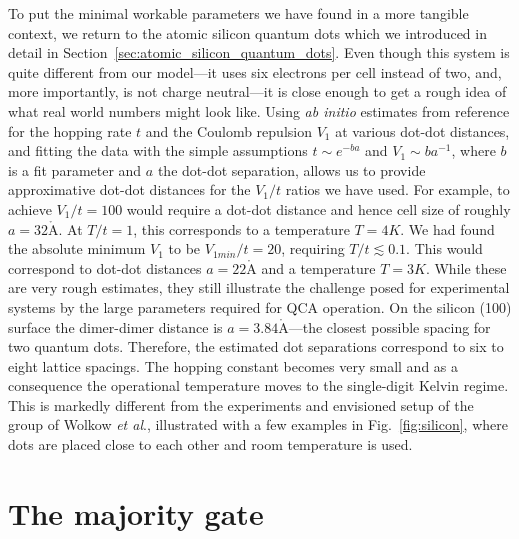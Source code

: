 To put the minimal workable parameters we have found in a more tangible context,
we return to the atomic silicon quantum dots which we introduced in detail in
Section~\ref{sec:atomic_silicon_quantum_dots}. Even though this system is quite
different from our model---it uses six electrons per cell instead of two, and,
more importantly, is not charge neutral---it is close enough to get a rough idea
of what real world numbers might look like. Using \emph{ab initio} estimates
from reference \cite{pitters2011tunnel} for the hopping rate $t$ and the Coulomb
repulsion $V_1$ at various dot-dot distances, and fitting the data with the
simple assumptions $t \sim e^{-b a}$ and $V_1 \sim b a^{-1}$, where $b$ is a fit
parameter and $a$ the dot-dot separation, allows us to provide approximative
dot-dot distances for the $V_1/t$ ratios we have used. For example, to achieve
$V_1/t = 100$ would require a dot-dot distance and hence cell size of roughly $a
= 32 \mathring{\mathrm{A}}$. At $T/t = 1$, this corresponds to a temperature $T
= 4K$. We had found the absolute minimum $V_1$ to be $V_{1min}/t = 20$,
requiring $T/t \lesssim 0.1$. This would correspond to dot-dot distances $a = 22
\mathring{\mathrm{A}}$ and a temperature $T = 3 K$. While these are very rough
estimates, they still illustrate the challenge posed for experimental systems by
the large parameters required for QCA operation. On the silicon (100) surface
the dimer-dimer distance is $a = 3.84 \mathring{\mathrm{A}}$---the closest
possible spacing for two quantum dots. Therefore, the estimated dot separations
correspond to six to eight lattice spacings. The hopping constant becomes very
small and as a consequence the operational temperature moves to the single-digit
Kelvin regime. This is markedly different from the experiments and envisioned
setup of the group of Wolkow \emph{et al}., illustrated with a few examples in
Fig.~\ref{fig:silicon}, where dots are placed close to each other and room
temperature is used.


\section{The majority gate}

